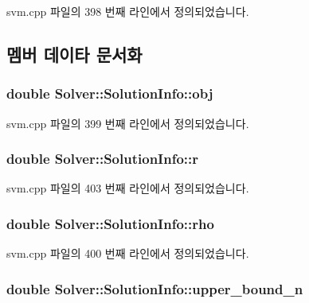 svm.\+cpp 파일의 398 번째 라인에서 정의되었습니다.



\subsection{멤버 데이타 문서화}
\hypertarget{struct_solver_1_1_solution_info_adf1d775e9152a7b1742057cd638ed2ae}{
\subsubsection[{obj}]{\setlength{\rightskip}{0pt plus 5cm}double Solver\+::\+Solution\+Info\+::obj}}\label{struct_solver_1_1_solution_info_adf1d775e9152a7b1742057cd638ed2ae}


svm.\+cpp 파일의 399 번째 라인에서 정의되었습니다.

\hypertarget{struct_solver_1_1_solution_info_a3db948f9e914e1f9976523cfdc7c1bbe}{
\subsubsection[{r}]{\setlength{\rightskip}{0pt plus 5cm}double Solver\+::\+Solution\+Info\+::r}}\label{struct_solver_1_1_solution_info_a3db948f9e914e1f9976523cfdc7c1bbe}


svm.\+cpp 파일의 403 번째 라인에서 정의되었습니다.

\hypertarget{struct_solver_1_1_solution_info_a8091f45a336af39e232f3845e25f2266}{
\subsubsection[{rho}]{\setlength{\rightskip}{0pt plus 5cm}double Solver\+::\+Solution\+Info\+::rho}}\label{struct_solver_1_1_solution_info_a8091f45a336af39e232f3845e25f2266}


svm.\+cpp 파일의 400 번째 라인에서 정의되었습니다.

\hypertarget{struct_solver_1_1_solution_info_a07ab9dc3265855f483922988bdaaf986}{
\subsubsection[{upper\+\_\+bound\+\_\+n}]{\setlength{\rightskip}{0pt plus 5cm}double Solver\+::\+Solution\+Info\+::upper\+\_\+bound\+\_\+n}}\label{struct_solver_1_1_solution_info_a07ab9dc3265855f483922988bdaaf986}


